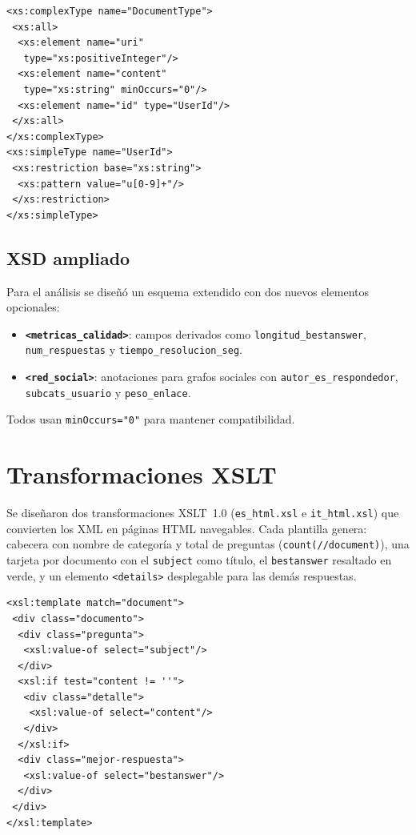 \documentclass[10pt,twocolumn,a4paper]{article}
\begin{document}
\begin{lstlisting}[language=XMLL,caption={Fragmento del XSD original.},label=lst:xsd, xleftmargin=0.5cm]
<xs:complexType name="DocumentType">
 <xs:all>
  <xs:element name="uri"
   type="xs:positiveInteger"/>
  <xs:element name="content"
   type="xs:string" minOccurs="0"/>
  <xs:element name="id" type="UserId"/>
 </xs:all>
</xs:complexType>
<xs:simpleType name="UserId">
 <xs:restriction base="xs:string">
  <xs:pattern value="u[0-9]+"/>
 </xs:restriction>
</xs:simpleType>
\end{lstlisting}

\subsection{XSD ampliado}

Para el an\'alisis se dise\~n\'o un esquema extendido con dos nuevos
elementos opcionales:

\begin{itemize}[leftmargin=1.5em,itemsep=0pt,topsep=2pt]
    \item \textbf{\texttt{<metricas\_calidad>}}: campos derivados como
          \texttt{longitud\_bestanswer}, \texttt{num\_respuestas} y
          \texttt{tiempo\_resolucion\_seg}.
    \item \textbf{\texttt{<red\_social>}}: anotaciones para grafos sociales
          con \texttt{autor\_es\_respondedor}, \texttt{subcats\_usuario}
          y \texttt{peso\_enlace}.
\end{itemize}

Todos usan \texttt{minOccurs="0"} para mantener compatibilidad.

\section{Transformaciones XSLT}

Se dise\~naron dos transformaciones XSLT~1.0 (\texttt{es\_html.xsl}
e \texttt{it\_html.xsl}) que convierten los XML en p\'aginas HTML
navegables. Cada plantilla genera: cabecera con nombre de categor\'ia
y total de preguntas (\texttt{count(//document)}), una tarjeta por
documento con el \texttt{subject} como t\'itulo, el \texttt{bestanswer}
resaltado en verde, y un elemento \texttt{<details>} desplegable para
las dem\'as respuestas.

\begin{lstlisting}[language=XMLL,caption={Plantilla XSLT por documento.},label=lst:xslt, xleftmargin=0.5cm]
<xsl:template match="document">
 <div class="documento">
  <div class="pregunta">
   <xsl:value-of select="subject"/>
  </div>
  <xsl:if test="content != ''">
   <div class="detalle">
    <xsl:value-of select="content"/>
   </div>
  </xsl:if>
  <div class="mejor-respuesta">
   <xsl:value-of select="bestanswer"/>
  </div>
 </div>
</xsl:template>
\end{lstlisting}
\end{document}
